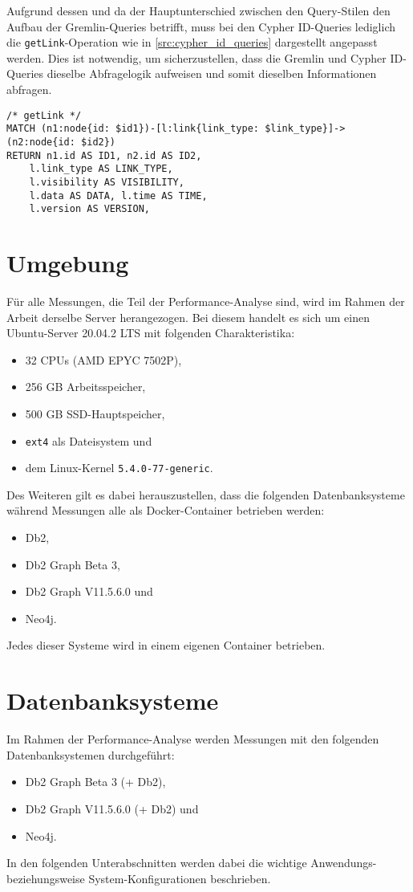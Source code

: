 Aufgrund dessen und da der Hauptunterschied zwischen den Query-Stilen den Aufbau der Gremlin-Queries betrifft, muss bei den Cypher ID-Queries lediglich die \texttt{getLink}-Operation wie in \autoref{src:cypher_id_queries} dargestellt
angepasst werden. Dies ist notwendig, um sicherzustellen, dass die Gremlin und Cypher ID-Queries dieselbe Abfragelogik aufweisen und somit dieselben Informationen abfragen. 
\begin{lstlisting}[label=src:cypher_id_queries,caption={Cypher ID-Queries},language=CQL]
/* getLink */
MATCH (n1:node{id: $id1})-[l:link{link_type: $link_type}]->(n2:node{id: $id2}) 
RETURN n1.id AS ID1, n2.id AS ID2, 
    l.link_type AS LINK_TYPE, 
    l.visibility AS VISIBILITY, 
    l.data AS DATA, l.time AS TIME, 
    l.version AS VERSION,
\end{lstlisting}

\section{Umgebung}
\label{analyse:umgebung}
Für alle Messungen, die Teil der Performance-Analyse sind, wird im Rahmen der Arbeit derselbe Server herangezogen. Bei diesem handelt es sich um einen Ubuntu-Server 20.04.2 LTS mit folgenden Charakteristika:
\begin{itemize}
    \item 32 CPUs (AMD EPYC 7502P), 
    \item 256 GB Arbeitsspeicher,
    \item 500 GB SSD-Hauptspeicher,
    \item \texttt{ext4} als Dateisystem und 
    \item dem Linux-Kernel \texttt{5.4.0-77-generic}.
\end{itemize}
Des Weiteren gilt es dabei herauszustellen, dass die folgenden Datenbanksysteme während Messungen alle als Docker-Container betrieben werden: 
\begin{itemize}
    \item Db2,
    \item Db2 Graph Beta 3,
    \item Db2 Graph V11.5.6.0 und 
    \item Neo4j. 
\end{itemize}
Jedes dieser Systeme wird in einem eigenen Container betrieben. 

\section{Datenbanksysteme}
\label{analyse:datanbanksysteme}
Im Rahmen der Performance-Analyse werden Messungen mit den folgenden Datenbanksystemen durchgeführt: 
\begin{itemize}
    \item Db2 Graph Beta 3 (+ Db2),
    \item Db2 Graph V11.5.6.0 (+ Db2) und
    \item Neo4j.
\end{itemize}
In den folgenden Unterabschnitten werden dabei die wichtige Anwendungs- be\-zieh\-ungs\-wei\-se System-Konfigurationen beschrieben. 

